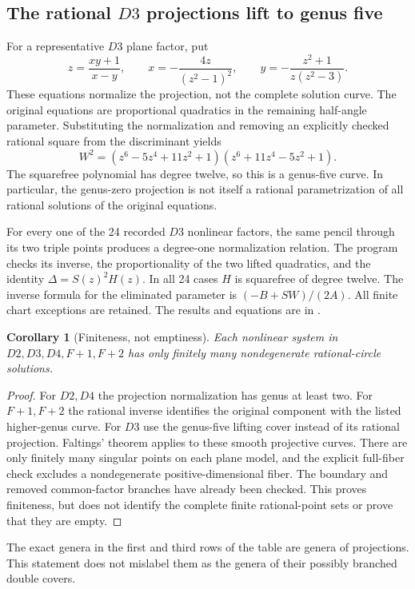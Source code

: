\documentclass[11pt,letterpaper]{article}
\newtheorem{corollary}[theorem]{Corollary}
\theoremstyle{definition}\newtheorem{definition}[theorem]{Definition}
\theoremstyle{remark}\newtheorem{remark}[theorem]{Remark}
\begin{document}
\subsection{The rational $D3$ projections lift to genus five}
For a representative $D3$ plane factor, put
\[
z=\frac{xy+1}{x-y},\qquad
x=-\frac{4z}{(z^2-1)^2},\qquad
y=-\frac{z^2+1}{z(z^2-3)}.
\]
These equations normalize the projection, not the complete solution curve. The original equations are proportional quadratics in the remaining half-angle parameter. Substituting the normalization and removing an explicitly checked rational square from the discriminant yields
\begin{equation}\label{eq:D3cover}
W^2=(z^6-5z^4+11z^2+1)(z^6+11z^4-5z^2+1).
\end{equation}
The squarefree polynomial has degree twelve, so this is a genus-five curve. In particular, the genus-zero projection is not itself a rational parametrization of all rational solutions of the original equations.

For every one of the 24 recorded $D3$ nonlinear factors, the same pencil through its two triple points produces a degree-one normalization relation. The program checks its inverse, the proportionality of the two lifted quadratics, and the identity $\Delta=S(z)^2H(z)$. In all 24 cases $H$ is squarefree of degree twelve. The inverse formula for the eliminated parameter is $(-B+S W)/(2A)$. All finite chart exceptions are retained. The results and equations are in .

\begin{corollary}[Finiteness, not emptiness]\label{cor:nonlinearfinite}
Each nonlinear system in $D2,D3,D4,F{+}1,F{+}2$ has only finitely many nondegenerate rational-circle solutions.
\end{corollary}
\begin{proof}
For $D2,D4$ the projection normalization has genus at least two. For $F{+}1,F{+}2$ the rational inverse identifies the original component with the listed higher-genus curve. For $D3$ use the genus-five lifting cover instead of its rational projection. Faltings' theorem applies to these smooth projective curves. There are only finitely many singular points on each plane model, and the explicit full-fiber check excludes a nondegenerate positive-dimensional fiber. The boundary and removed common-factor branches have already been checked. This proves finiteness, but does not identify the complete finite rational-point sets or prove that they are empty.
\end{proof}
The exact genera in the first and third rows of the table are genera of projections. This statement does not mislabel them as the genera of their possibly branched double covers.
\end{document}
